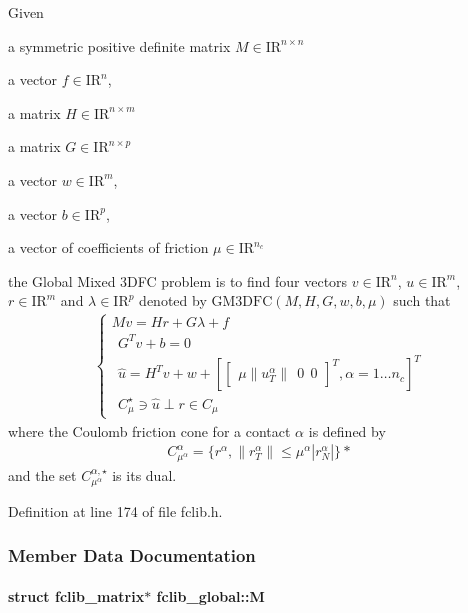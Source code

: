 Given 
\begin{DoxyItemize}
\item a symmetric positive definite matrix ${M} \in {\mathrm{I\!R}}^{n \times n}$ 
\item a vector $ {f} \in {\mathrm{I\!R}}^n$, 
\item a matrix ${H} \in {\mathrm{I\!R}}^{n \times m}$ 
\item a matrix ${G} \in {\mathrm{I\!R}}^{n \times p}$ 
\item a vector $w \in {\mathrm{I\!R}}^{m}$, 
\item a vector $b \in {\mathrm{I\!R}}^{p}$, 
\item a vector of coefficients of friction $\mu \in {\mathrm{I\!R}}^{n_c}$ 
\end{DoxyItemize}the Global Mixed 3\+D\+F\+C problem is to find four vectors $ {v} \in {\mathrm{I\!R}}^n$, $u\in{\mathrm{I\!R}}^m$, $r\in {\mathrm{I\!R}}^m$ and $\lambda \in {\mathrm{I\!R}}^p$ denoted by $\mathrm{GM3DFC}(M,H,G,w,b,\mu)$ such that \begin{eqnarray*} \begin{cases} M v = {H} {r} + G\lambda + {f} \\ \ \ G^T v +b =0 \\ \ \ \hat u = H^T v + w +\left[ \left[\begin{array}{c} \mu \|u^\alpha_T\|\ \ 0 \ \ 0 \end{array}\right]^T, \alpha = 1 \ldots n_c \right]^T \\ \ \ C^\star_{\mu} \ni {\hat u} \perp r \in C_{\mu} \end{cases} \end{eqnarray*} where the Coulomb friction cone for a contact $\alpha$ is defined by \begin{eqnarray*} \label{eq:CCC} C_{\mu^\alpha}^{\alpha} = \{r^\alpha, \|r^\alpha_T \| \leq \mu^\alpha |r^\alpha_N| \} *\end{eqnarray*} and the set $C^{\alpha,\star}_{\mu^\alpha}$ is its dual. 

Definition at line 174 of file fclib.\+h.



\subsubsection{Member Data Documentation}
\hypertarget{structfclib__global_a82538cefd07d0f1f6c1e7baebe768fc6}{}
\paragraph[{M}]{\setlength{\rightskip}{0pt plus 5cm}struct {\bf fclib\+\_\+matrix}$\ast$ fclib\+\_\+global\+::\+M}\label{structfclib__global_a82538cefd07d0f1f6c1e7baebe768fc6}


